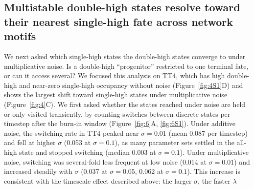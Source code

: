 \documentclass[11pt]{article}
\providecommand{\DIFaddtex}[1]{{\protect\color{red}#1}} %
\providecommand{\DIFdeltex}[1]{} %
\providecommand{\DIFaddbegin}{} %
\providecommand{\DIFaddend}{} %
\providecommand{\DIFdelbegin}{} %
\providecommand{\DIFdelend}{} %
\providecommand{\DIFadd}[1]{\texorpdfstring{\DIFaddtex{#1}}{#1}} %
\providecommand{\DIFdel}[1]{\texorpdfstring{\DIFdeltex{#1}}{}} %
\providecommand{\DIFaddincludegraphics}[2][]{\DIFOincludegraphics[#1]{#2}} %
\providecommand{\DIFdelincludegraphics}[2][]{}
\DeclareRobustCommand{\DIFaddbegin}{\DIFOaddbegin \let\includegraphics\DIFaddincludegraphics} %
\DeclareRobustCommand{\DIFaddend}{\DIFOaddend \let\includegraphics\DIFOincludegraphics} %
\DeclareRobustCommand{\DIFdelbegin}{\DIFOdelbegin \let\includegraphics\DIFdelincludegraphics} %
\DeclareRobustCommand{\DIFdelend}{\DIFOaddend \let\includegraphics\DIFOincludegraphics} %
\begin{document}
\DIFaddend \subsection{Multistable double-high states resolve toward their nearest single-high fate across network motifs}
\DIFaddbegin 

\DIFaddend We next asked which single-high states the \DIFdelbegin \DIFdel{hybrid }\DIFdelend double-high states converge to under multiplicative noise. Is a double-high ``progenitor'' restricted to one terminal fate, or can it access several? We focused this analysis on TT4, which has \DIFdelbegin \DIFdel{a }\DIFdelend high double-high and \DIFdelbegin \DIFdel{low ($\approx 0$) }\DIFdelend \DIFaddbegin \DIFadd{near-zero }\DIFaddend single-high \DIFdelbegin \DIFdel{frequency in deterministic simulations }\DIFdelend \DIFaddbegin \DIFadd{occupancy without noise }\DIFaddend (Figure~\ref{fig:4S1}D) and \DIFdelbegin \DIFdel{gives the cleanest signal of double-high to }\DIFdelend \DIFaddbegin \DIFadd{shows the largest shift toward }\DIFaddend single-high \DIFdelbegin \DIFdel{transition in the network motifs we studied so far }\DIFdelend \DIFaddbegin \DIFadd{states under multiplicative noise }\DIFaddend (Figure~\ref{fig:4}C). \DIFdelbegin \DIFdel{To confirm that this terminal commitment reflects genuinely stable fates rather than continued flickering between states , we examined switching-event rates, measured the mean number of switches in discrete state space observed during stochastic simulations at different noise level }\DIFdelend \DIFaddbegin \DIFadd{We first asked whether the states reached under noise are held or only visited transiently, by counting switches between discrete states per timestep after the burn-in window }\DIFaddend (Figure~\ref{fig:6}A, \DIFdelbegin \DIFdel{~}\DIFdelend \ref{fig:6S1}). Under additive noise, \DIFdelbegin \DIFdel{switching rates rose with noise level before leveling off or mildly declining by $\sigma=0.1$, across every network and stability class}\DIFdelend \DIFaddbegin \DIFadd{the switching rate in TT4 peaked near $\sigma = 0.01$ (mean 0.087 per timestep) and fell at higher $\sigma$ (0.053 at $\sigma = 0.1$), as many parameter sets settled in the all-high state and stopped switching (median 0.003 at $\sigma = 0.1$)}\DIFaddend . Under multiplicative noise, \DIFdelbegin \DIFdel{by contrast, switching events remained close to zero throughout this same range, regardless of network or class. A notable trend however is that while additive noise showed a decrease in the switching rate as noise increased, multiplicative noise showed an increase owing to the spread of }\DIFdelend \DIFaddbegin \DIFadd{switching was several-fold less frequent at low noise (0.014 at $\sigma = 0.01$) and increased steadily with $\sigma$ (0.037 at $\sigma = 0.05$, 0.062 at $\sigma = 0.1$). This increase is consistent with the timescale effect described above: the larger $\sigma$, the faster }\DIFaddend $\lambda$ \DIFdelbegin \DIFdel{distribution discussed earlier. 
}%
\end{document}
